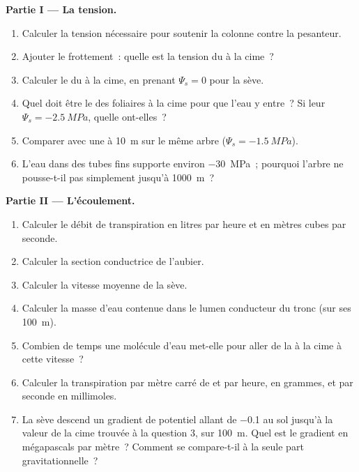 \begin{problem}
\medskip
\noindent\textbf{Partie I --- La tension.}
\begin{enumerate}
  \item Calculer la tension nécessaire pour soutenir la colonne contre
        la pesanteur.
  \item Ajouter le frottement~: quelle est la tension du  à la
        cime~?
  \item Calculer le  du  à la cime, en prenant
        $\Psi_s = 0$ pour la sève.
  \item Quel doit être le  des  foliaires à
        la cime pour que l'eau y entre~? Si leur $\Psi_s = \qty{-2.5}{MPa}$,
        quelle  ont-elles~?
  \item Comparer avec une  à \qty{10}{m} sur le même arbre ($\Psi_s =
        \qty{-1.5}{MPa}$).
  \item L'eau dans des tubes fins supporte environ \qty{-30}{MPa}~;
        pourquoi l'arbre ne pousse-t-il pas simplement jusqu'à
        \qty{1000}{m}~?
\end{enumerate}

\medskip
\noindent\textbf{Partie II --- L'écoulement.}
\begin{enumerate}[resume]
  \item Calculer le débit de transpiration en litres par heure et en
        mètres cubes par seconde.
  \item Calculer la section conductrice de l'aubier.
  \item Calculer la vitesse moyenne de la sève.
  \item Calculer la masse d'eau contenue dans le lumen conducteur du
        tronc (sur ses \qty{100}{m}).
  \item Combien de temps une molécule d'eau met-elle pour aller de la
         à la cime à cette vitesse~?
  \item Calculer la transpiration par mètre carré de  et par
        heure, en grammes, et par seconde en millimoles.
  \item La sève descend un gradient de potentiel allant de \qty{-0.1}{}
        au sol jusqu'à la valeur de la cime trouvée à la question 3,
        sur \qty{100}{m}. Quel est le gradient en mégapascals par
        mètre~? Comment se compare-t-il à la seule part
        gravitationnelle~?
\end{enumerate}


\end{problem}
